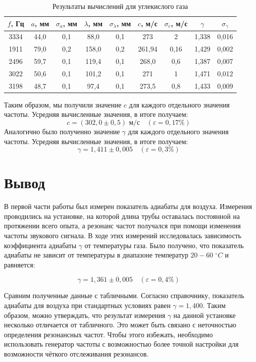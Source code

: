 \documentclass[12pt,a4paper]{article}
\begin{document}
\begin{table}[!h]
	\centering
	\begin{tabular}{|c|c|c|c|c|c|c|c|c|}
		\hline
		$ f $, Гц & $ a $, мм & $ \sigma_a $, мм & $ \lambda $, мм & $ \sigma_\lambda $, мм & $ c $, м/с & $ \sigma_c $, м/с& $ \gamma  $ & $ \sigma_\gamma  $ \\ \hline
		3334 & 44,0 & 0,1 & 88,0 & 0,1 & 273 & 2 & 1,338 &0,016\\ \hline
		1911 & 79,0 & 0,2 & 158,0 & 0,2 & 261,94 & 0,16  & 1,429&0,002\\ \hline
		2496 & 59,7 & 0,1 & 119,4 & 0,1 & 268,0 & 0,6 &1,387 & 0,007 \\ \hline
		3022 & 50,6 & 0,1 & 101,2 & 0,1 & 271 & 1  &1,471 &0,012\\ \hline
		3198 & 48,7 & 0,1 & 97,4 & 0,1 & 273,5 & 0,8 & 1,433&0,009\\ \hline
	\end{tabular}
	\caption{Результаты вычислений для углекислого газа}
	\label{tab:resO2}
\end{table}




Таким образом, мы получили значение $ c $ для каждого отдельного значения частоты. Усредняя вычисленные значения, в итоге получаем: \[\boxed{ c = (302,0 \pm 0,5) \text{ м/с}}\quad (\varepsilon=0,17\%) \]
Аналогично было полученно значение $\gamma$ для каждого отдельного значения частоты. Усредняя вычисленные значения, в итоге получаем: 
\[ \boxed{\gamma = 1,411 \pm 0,005}\quad (\varepsilon=0,3\%) \]


\section{Вывод}


В первой части работы был измерен показатель адиабаты для воздуха. Измерения проводились на установке, на которой длина трубы оставалась постоянной на протяжении всего опыта, а резонанс частот получался при помощи изменения частоты звукового сигнала. В ходе этих измерений исследовалась зависимость коэффициента адиабаты $ \gamma $ от температуры газа. Было получено, что показатель адиабаты не зависит от температуры в диапазоне температур $ 20-60 $ $ ^\circ C $ и равняется:

\[ \boxed{\gamma = 1,361 \pm 0,005}\quad (\varepsilon=0,4\%) \]

Сравним полученные данные с табличными. Согласно справочнику, показатель адиабаты для воздуха при стандартных условиях равен \underline{$ \gamma = 1,400 $}. Таким образом, можно утверждать, что результат измерения $ \gamma $ на данной установке несколько отличается от табличного. Это может быть связано с неточностью определения резонансных частот. Чтобы этого избежать, необходимо использовать генератор частоты с возможностью более точной настройки для возможности чёткого отслеживания резонансов.
\end{document}

